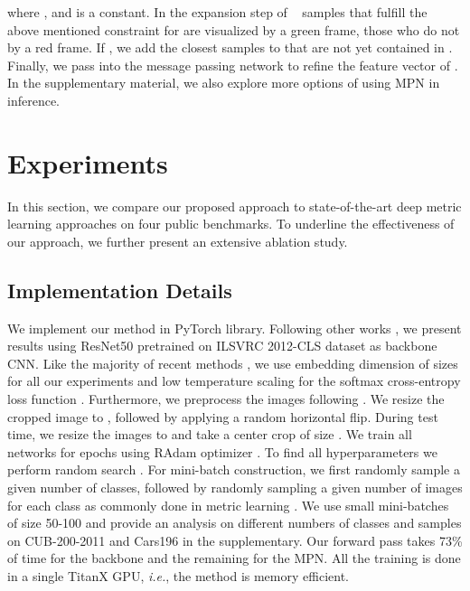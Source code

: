 \documentclass{article}
\begin{document}
where ,  and  is a constant. In the expansion step of ~ samples that fulfill the above mentioned constraint for  are visualized by a green frame, those who do not by a red frame. If , we add the closest samples to  that are not yet contained in . Finally, we pass  into the message passing network to refine the feature vector of . In the supplementary material, we also explore more options of using MPN in inference.
\fi \section{Experiments}

In this section, we compare our proposed approach to state-of-the-art deep metric learning approaches on four public benchmarks. To underline the effectiveness of our approach, we further present an extensive ablation study.
\vspace{-0.3cm}
\subsection{Implementation Details}


We implement our method in PyTorch \cite{Paszke17} library. Following other works \cite{DBLP:conf/iccv/BrattoliRO19,DBLP:conf/cvpr/Cakir0XKS19,DBLP:conf/iccv/ManmathaWSK17,DDBLP:conf/cvpr/Sanakoyeu2019,DBLP:journals/corr/abs-2004-01113,DBLP:conf/wacv/XuanSP20,DBLP:journals/corr/abs-1811-12649}, we present results using ResNet50 \cite{7780459} pretrained on ILSVRC 2012-CLS dataset \cite{DBLP:journals/corr/RussakovskyDSKSMHKKBBF14} as backbone CNN. Like the majority of recent methods \cite{DBLP:conf/eccv/GeHDS18, DBLP:conf/cvpr/KimKCK20,DBLP:conf/cvpr/Park2019, DBLP:journals/corr/abs-1909-05235,DDBLP:conf/cvpr/Wand2019, DBLP:conf/cvpr/WangHKHGR19, DBLP:journals/corr/abs-2010-13636}, we use embedding dimension of sizes  for all our experiments and low temperature scaling for the softmax cross-entropy loss function \cite{DBLP:conf/icml/GuoPSW17}. Furthermore, we preprocess the images following \cite{DBLP:conf/cvpr/KimKCK20}. We resize the cropped image to , followed by applying a random horizontal flip.
During test time, we resize the images to  and take a center crop of size . 
We train all networks for  epochs using RAdam optimizer \cite{DBLP:journals/corr/abs-1908-03265}.
To find all hyperparameters we perform random search \cite{DBLP:journals/jmlr/BergstraB12}. For mini-batch construction, we first randomly sample a given number of classes, followed by randomly sampling a given number of images for each class as commonly done in metric learning \cite{DBLP:conf/eccv/GrLoss,DBLP:conf/cvpr/SchroffKP15,DBLP:journals/corr/abs-2004-01113, DBLP:journals/corr/abs-1811-12649}. We use small mini-batches of size 50-100 and provide an analysis on different numbers of classes and samples on CUB-200-2011 and Cars196 in the supplementary. Our forward pass takes 73\% of time for the backbone and the remaining for the MPN. All the training is done in a single TitanX GPU, \textit{i.e.}, the method is memory efficient.
\vspace{-0.3cm}
\end{document}
